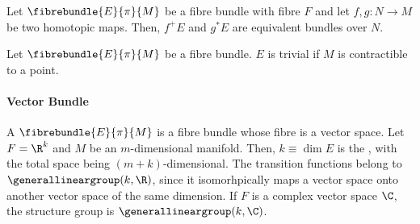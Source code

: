 \begin{theo}

    Let $\fibrebundle{E}{\pi}{M}$ be a fibre bundle with fibre $F$ and let $f,g: N \rightarrow M$ be two homotopic maps. 
    Then, $f^{+} E$ and $g^{*} E$ are equivalent bundles over $N$.
     
\end{theo}

\iffalse
\begin{proof}

    In effect, let $M$ be a manifold which is contractible to a point. 
    Then, there exists a homotopy $F: M \times \R_{[0,1]} \rightarrow M$ s.t. 

    \[
        F(p, 0) = p, \quad F(p, 1) = p_0,
    \]

    where $p_0 \in M$ is a fixed point. 
    Let $\fibrebundle{E}{\pi}{M}$ be a fibre bundle over $M$ and consider pullback bundles $h_0^{*}E$ and $h_1^{*}E$, where $h_t(p) \equiv F(p,t)$.
    The fibre bundle $h_1^{*}E$ is a pullback of a fibre bundle $\{p_0\} \times F$, and hence is a trivial bundle: $h_1^{*}E \simeq M \times F$.
    
\end{proof}
\fi

\begin{lemma}

    Let $\fibrebundle{E}{\pi}{M}$ be a fibre bundle. $E$ is trivial if $M$ is contractible to a point. 

\end{lemma}

\blanky \smallbreak 

\paragraph{Vector Bundle}

A  $\fibrebundle{E}{\pi}{M}$ is a fibre bundle whose fibre is a vector space. 
Let $F = \R^k$ and $M$ be an $m$-dimensional manifold. 
Then, $k \equiv \dim E$ is the , with the total space being $(m+k)$-dimensional. 
The transition functions belong to $\generallineargroup(k, \R)$, since it isomorhpically maps a vector space onto another vector space of the same dimension.
If $F$ is a complex vector space $\C$, the structure group is $\generallineargroup(k, \C)$. \smallbreak

\begin{remark}
\end{remark}

